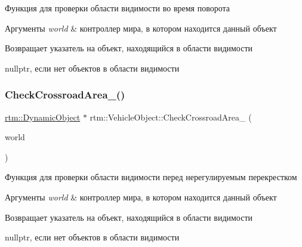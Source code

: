 Функция для проверки области видимости во время поворота 
\begin{DoxyParams}{Аргументы}
{\em world} & контроллер мира, в котором находится данный объект \\
\hline
\end{DoxyParams}
\begin{DoxyReturn}{Возвращает}
указатель на объект, находящийся в области видимости 

nullptr, если нет объектов в области видимости 
\end{DoxyReturn}
\mbox{\label{classrtm_1_1_vehicle_object_a1e193bc81dc4b6c14d29c6be17db1071}} 
\subsubsection{\texorpdfstring{Check\+Crossroad\+Area\+\_\+()}{CheckCrossroadArea\_()}}
{\footnotesize\ttfamily \hyperlink{classrtm_1_1_dynamic_object}{rtm\+::\+Dynamic\+Object} $\ast$ rtm\+::\+Vehicle\+Object\+::\+Check\+Crossroad\+Area\+\_\+ (\begin{DoxyParamCaption}\item[{\hyperlink{classrtm_1_1_world_controller}{World\+Controller} $\ast$const}]{world }\end{DoxyParamCaption})\hspace{0.3cm}{\ttfamily [protected]}}

Функция для проверки области видимости перед нерегулируемым перекрестком 
\begin{DoxyParams}{Аргументы}
{\em world} & контроллер мира, в котором находится данный объект \\
\hline
\end{DoxyParams}
\begin{DoxyReturn}{Возвращает}
указатель на объект, находящийся в области видимости 

nullptr, если нет объектов в области видимости 
\end{DoxyReturn}
\mbox{\label{classrtm_1_1_vehicle_object_a397b0e3055f0dfe3f2b1b731cd5e2eb1}} 

